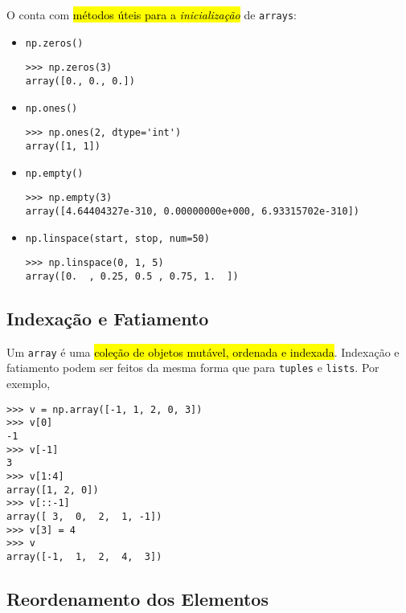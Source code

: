 O {\numpy} conta com \hl{métodos úteis para a \emph{inicialização}} de \lstinline+arrays+:
\begin{itemize}
\item \lstinline+np.zeros()+  

\begin{lstlisting}
>>> np.zeros(3)
array([0., 0., 0.])
\end{lstlisting}

\item \lstinline+np.ones()+ 

\begin{lstlisting}
>>> np.ones(2, dtype='int')
array([1, 1])
\end{lstlisting}

\item \lstinline+np.empty()+ 

\begin{lstlisting}
>>> np.empty(3)
array([4.64404327e-310, 0.00000000e+000, 6.93315702e-310])
\end{lstlisting}

\item \lstinline+np.linspace(start, stop, num=50)+ 

\begin{lstlisting}
>>> np.linspace(0, 1, 5)
array([0.  , 0.25, 0.5 , 0.75, 1.  ])
\end{lstlisting}
\end{itemize}

\subsection{Indexação e Fatiamento}\label{cap_arr_sec_arr:ssec:islice}

Um \lstinline+array+ é uma \hl{coleção de objetos mutável, ordenada e indexada}. Indexação e fatiamento podem ser feitos da mesma forma que para \lstinline+tuples+ e \lstinline+lists+. Por exemplo,

\begin{lstlisting}
>>> v = np.array([-1, 1, 2, 0, 3])
>>> v[0]
-1
>>> v[-1]
3
>>> v[1:4]
array([1, 2, 0])
>>> v[::-1]
array([ 3,  0,  2,  1, -1])
>>> v[3] = 4
>>> v
array([-1,  1,  2,  4,  3])
\end{lstlisting}

\subsection{Reordenamento dos Elementos}

